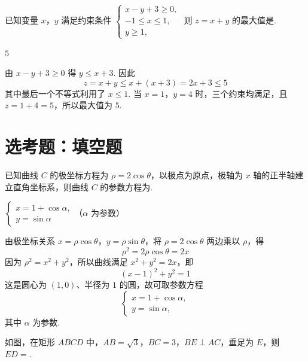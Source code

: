 \begin{problem}
已知变量 \(x\)，\(y\) 满足约束条件 \(\begin{cases}
x - y + 3 \geqslant 0,\\
-1 \leqslant x \leqslant 1,\\
y \geqslant 1,
\end{cases}\) 则 \(z = x + y\) 的最大值是\fillinblank{}.
\end{problem}

\begin{answer}
\(5\)
\end{answer}

\begin{solution}
由 \(x-y+3\geq0\) 得 \(y\leq x+3\). 因此
\[
z=x+y\leq x+(x+3)=2x+3\leq5
\]
其中最后一个不等式利用了 \(x\leq1\). 当 \(x=1\)，\(y=4\) 时，三个约束均满足，且 \(z=1+4=5\)，所以最大值为 \(5\).
\end{solution}

\section{选考题：填空题}

\begin{problem}
已知曲线 \(C\) 的极坐标方程为 \(\rho = 2\cos \theta\)，以极点为原点，极轴为 \(x\) 轴的正半轴建立直角坐标系，则曲线 \(C\) 的参数方程为\fillinblank{}.
\end{problem}

\begin{answer}
\(
\begin{cases}
x=1+\cos\alpha,\\
y=\sin\alpha
\end{cases}
\)（\(\alpha\) 为参数）
\end{answer}

\begin{solution}
由极坐标关系 \(x=\rho\cos\theta\)，\(y=\rho\sin\theta\)，将 \(\rho=2\cos\theta\) 两边乘以 \(\rho\)，得
\[
\rho^2=2\rho\cos\theta=2x
\]
因为 \(\rho^2=x^2+y^2\)，所以曲线满足 \(x^2+y^2=2x\)，即
\[
(x-1)^2+y^2=1
\]
这是圆心为 \((1,0)\)、半径为 \(1\) 的圆，故可取参数方程
\[
\begin{cases}
x=1+\cos\alpha,\\
y=\sin\alpha,
\end{cases}
\]
其中 \(\alpha\) 为参数.
\end{solution}

\begin{problem}
如图，在矩形 \(ABCD\) 中，\(AB = \sqrt{3}\)，\(BC = 3\)，\(BE \perp AC\)，垂足为 \(E\)，则 \(ED = \)\fillinblank{}.

\end{problem}

